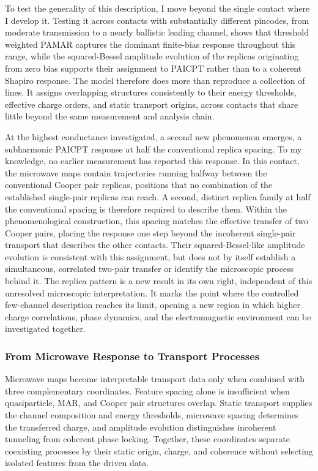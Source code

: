        To test the generality of this description, I move beyond the single contact where I develop it. Testing it across contacts with substantially different pincodes, from moderate transmission to a nearly ballistic leading channel, shows that threshold weighted PAMAR captures the dominant finite-bias response throughout this range, while the squared-Bessel amplitude evolution of the replicas originating from zero bias supports their assignment to PAICPT rather than to a coherent Shapiro response. The model therefore does more than reproduce a collection of lines. It assigns overlapping structures consistently to their energy thresholds, effective charge orders, and static transport origins, across contacts that share little beyond the same measurement and analysis chain.

        At the highest conductance investigated, a second new phenomenon emerges, a subharmonic PAICPT response at half the conventional replica spacing. To my knowledge, no earlier measurement has reported this response. In this contact, the microwave maps contain trajectories running halfway between the conventional Cooper pair replicas, positions that no combination of the established single-pair replicas can reach. A second, distinct replica family at half the conventional spacing is therefore required to describe them. Within the phenomenological construction, this spacing matches the effective transfer of two Cooper pairs, placing the response one step beyond the incoherent single-pair transport that describes the other contacts. Their squared-Bessel-like amplitude evolution is consistent with this assignment, but does not by itself establish a simultaneous, correlated two-pair transfer or identify the microscopic process behind it. The replica pattern is a new result in its own right, independent of this unresolved microscopic interpretation. It marks the point where the controlled few-channel description reaches its limit, opening a new region in which higher charge correlations, phase dynamics, and the electromagnetic environment can be investigated together.

    \subsubsection*{From Microwave Response to Transport Processes}

        Microwave maps become interpretable transport data only when combined with three complementary coordinates. Feature spacing alone is insufficient when quasiparticle, MAR, and Cooper pair structures overlap. Static transport supplies the channel composition and energy thresholds, microwave spacing determines the transferred charge, and amplitude evolution distinguishes incoherent tunneling from coherent phase locking. Together, these coordinates separate coexisting processes by their static origin, charge, and coherence without selecting isolated features from the driven data.

